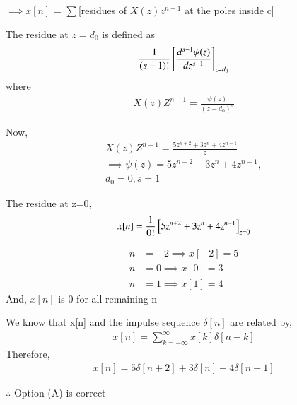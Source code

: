 \documentclass[journal,12pt,twocolumn]{IEEEtran}
\begin{document}
$\implies x[n]$ = $\sum$[residues of $X(z)z^{n-1}$ at the poles inside c]

The residue at $z = d_0$ is defined as 
\begin{align}
    \frac{1}{(s-1)!}{}\left[\frac{d^{s-1}\psi(z)}{dz^{s-1}}\right]_{z=d_0}
\end{align}
where
\begin{align}
X(z)Z^{n-1} = \frac{\psi(z)}{(z-d_0)^s}
\end{align}

Now,
\begin{align}
X(z)Z^{n-1} = \frac{5z^{n+2} + 3z^n + 4z^{n-1}}{z}\\
\implies \psi(z) = 5z^{n+2} + 3z^n + 4z^{n-1},\\ 
d_0 = 0, s = 1
\end{align}

The residue at z=0,
\begin{align}
  x[n] = \frac{1}{0!}{}\left[5z^{n+2} + 3z^n + 4z^{n-1}\right]_{z=0}
\end{align}

\begin{align}
    n &= -2 \implies x[-2] = 5\\ 
    n &= 0 \implies x[0] = 3\\
    n &= 1 \implies x[1] = 4
\end{align}
And, $x[n]$ is 0 for all remaining n

We know that x[n] and the impulse sequence $\delta[n]$ are related by,
\begin{align}
    x[n] = \sum_{k=-\infty}^{\infty} x[k]\delta[n-k]
\end{align}
Therefore,
\begin{align}
    x[n] = 5\delta[n+2] + 3\delta[n] + 4\delta[n-1]
\end{align}

$\therefore$ Option (A) is correct
\end{document}
